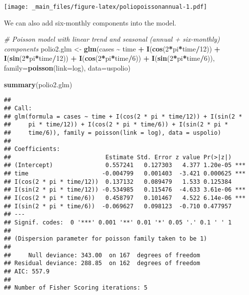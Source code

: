 \documentclass[
  12pt,
]{book}
\newenvironment{Shaded}{\begin{snugshade}}{\end{snugshade}}
\newcommand{\AttributeTok}[1]{\textcolor[rgb]{0.13,0.29,0.53}{#1}}
\newcommand{\CommentTok}[1]{\textcolor[rgb]{0.56,0.35,0.01}{\textit{#1}}}
\newcommand{\DecValTok}[1]{\textcolor[rgb]{0.00,0.00,0.81}{#1}}
\newcommand{\FunctionTok}[1]{\textcolor[rgb]{0.13,0.29,0.53}{\textbf{#1}}}
\newcommand{\NormalTok}[1]{#1}
\newcommand{\OtherTok}[1]{\textcolor[rgb]{0.56,0.35,0.01}{#1}}
\newcommand{\SpecialCharTok}[1]{\textcolor[rgb]{0.81,0.36,0.00}{\textbf{#1}}}
\begin{document}
\texttt{[image: \_main\_files/figure-latex/poliopoissonannual-1.pdf]}

We can also add six-monthly components into the model.

\begin{Shaded}
\begin{Highlighting}[]
\CommentTok{\# Poisson model with linear trend and seasonal (annual + six{-}monthly) components}
\NormalTok{polio2.glm }\OtherTok{\textless{}{-}} \FunctionTok{glm}\NormalTok{(cases }\SpecialCharTok{\textasciitilde{}}\NormalTok{ time }\SpecialCharTok{+} \FunctionTok{I}\NormalTok{(}\FunctionTok{cos}\NormalTok{(}\DecValTok{2}\SpecialCharTok{*}\NormalTok{pi}\SpecialCharTok{*}\NormalTok{time}\SpecialCharTok{/}\DecValTok{12}\NormalTok{)) }\SpecialCharTok{+} \FunctionTok{I}\NormalTok{(}\FunctionTok{sin}\NormalTok{(}\DecValTok{2}\SpecialCharTok{*}\NormalTok{pi}\SpecialCharTok{*}\NormalTok{time}\SpecialCharTok{/}\DecValTok{12}\NormalTok{))}
\SpecialCharTok{+} \FunctionTok{I}\NormalTok{(}\FunctionTok{cos}\NormalTok{(}\DecValTok{2}\SpecialCharTok{*}\NormalTok{pi}\SpecialCharTok{*}\NormalTok{time}\SpecialCharTok{/}\DecValTok{6}\NormalTok{)) }\SpecialCharTok{+} \FunctionTok{I}\NormalTok{(}\FunctionTok{sin}\NormalTok{(}\DecValTok{2}\SpecialCharTok{*}\NormalTok{pi}\SpecialCharTok{*}\NormalTok{time}\SpecialCharTok{/}\DecValTok{6}\NormalTok{)), }\AttributeTok{family=}\FunctionTok{poisson}\NormalTok{(}\AttributeTok{link=}\NormalTok{log),}
\AttributeTok{data=}\NormalTok{uspolio)}

\FunctionTok{summary}\NormalTok{(polio2.glm)}
\end{Highlighting}
\end{Shaded}

\begin{verbatim}
## 
## Call:
## glm(formula = cases ~ time + I(cos(2 * pi * time/12)) + I(sin(2 * 
##     pi * time/12)) + I(cos(2 * pi * time/6)) + I(sin(2 * pi * 
##     time/6)), family = poisson(link = log), data = uspolio)
## 
## Coefficients:
##                           Estimate Std. Error z value Pr(>|z|)    
## (Intercept)               0.557241   0.127303   4.377 1.20e-05 ***
## time                     -0.004799   0.001403  -3.421 0.000625 ***
## I(cos(2 * pi * time/12))  0.137132   0.089479   1.533 0.125384    
## I(sin(2 * pi * time/12)) -0.534985   0.115476  -4.633 3.61e-06 ***
## I(cos(2 * pi * time/6))   0.458797   0.101467   4.522 6.14e-06 ***
## I(sin(2 * pi * time/6))  -0.069627   0.098123  -0.710 0.477957    
## ---
## Signif. codes:  0 '***' 0.001 '**' 0.01 '*' 0.05 '.' 0.1 ' ' 1
## 
## (Dispersion parameter for poisson family taken to be 1)
## 
##     Null deviance: 343.00  on 167  degrees of freedom
## Residual deviance: 288.85  on 162  degrees of freedom
## AIC: 557.9
## 
## Number of Fisher Scoring iterations: 5
\end{verbatim}
\end{document}
